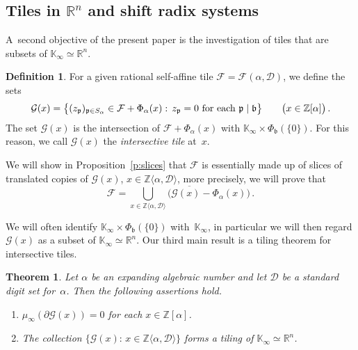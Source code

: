 \documentclass[12pt]{amsart}
\newtheorem{theorem}{Theorem}
\theoremstyle{definition}
\newtheorem{definition}{Definition}
\theoremstyle{remark}
\numberwithin{equation}{section}
\begin{document}
\subsection*{Tiles in $\mathbb{R}^n$ and shift radix systems}
A~second objective of the present paper is the investigation of tiles that are subsets of $\mathbb{K}_\infty \simeq \mathbb{R}^n$.

\begin{definition}
For a given rational self-affine tile $\mathcal{F}=\mathcal{F}(\alpha,\mathcal{D})$, we define the sets
\[
\mathcal{G}(x) = \big\{(z_\mathfrak{p})_{\mathfrak{p}\in S_\alpha} \in \mathcal{F} + \Phi_\alpha(x):\, z_\mathfrak{p}=0\ \hbox{for each}\ \mathfrak{p}\mid \mathfrak{b}\big\} \qquad \big(x \in \mathbb{Z}[\alpha]\big)\,.
\]
The set $\mathcal{G}(x)$ is the intersection of $\mathcal{F} + \Phi_\alpha(x)$ with $\mathbb{K}_\infty \times \Phi_\mathfrak{b}(\{0\})$.
For this reason, we call $\mathcal{G}(x)$ the \emph{intersective tile} at~$x$.
\end{definition}

We will show in Proposition~\ref{p:slices} that $\mathcal{F}$ is essentially made up of slices of translated copies of $\mathcal{G}(x)$, $x \in \mathbb{Z}\langle \alpha, \mathcal{D}\rangle$, more precisely, we will prove that
\begin{equation} \label{e:slices}
\mathcal{F} = \overline{\bigcup_{x \in \mathbb{Z}\langle \alpha, \mathcal{D}\rangle} \big(\mathcal{G}(x) - \Phi_\alpha(x)\big)}\,.
\end{equation}

We will often identify $\mathbb{K}_\infty \times \Phi_\mathfrak{b}(\{0\})$ with~$\mathbb{K}_\infty$, in particular we will then regard $\mathcal{G}(x)$ as a subset of $\mathbb{K}_\infty \simeq \mathbb{R}^n$.
Our third main result is a tiling theorem for intersective tiles.

\begin{theorem} \label{srstiling}
Let $\alpha$ be an expanding algebraic number and let $\mathcal{D}$ be a standard digit set for~$\alpha$. Then the following assertions hold.

\begin{enumerate}
\itemsep1ex
\item \label{three:i}
$\mu_\infty(\partial \mathcal{G}(x))=0$ for each $x\in\mathbb{Z}[\alpha]$.
\item \label{three:ii}
The collection $\{\mathcal{G}(x):\, x \in \mathbb{Z}\langle \alpha, \mathcal{D}\rangle\}$ forms a tiling of $\mathbb{K}_\infty \simeq \mathbb{R}^n$.
\end{enumerate}
\end{theorem}
\end{document}
